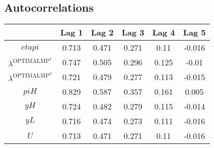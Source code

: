 \subsection{Autocorrelations}

\begin{tabular}{c|ccccc|}
  & Lag 1 & Lag 2 & Lag 3 & Lag 4 & Lag 5\\
\hline
${e\!t\!a\!p\!i}$ & 0.713 & 0.471 & 0.271 & 0.11 & -0.016 \\
$\lambda^{\mathrm{OPTIMALMP}^{\mathrm{1}}}$ & 0.747 & 0.505 & 0.296 & 0.125 & -0.01 \\
$\lambda^{\mathrm{OPTIMALMP}^{\mathrm{2}}}$ & 0.721 & 0.479 & 0.277 & 0.113 & -0.015 \\
${p\!i\!H}$ & 0.829 & 0.587 & 0.357 & 0.161 & 0.005 \\
${y\!H}$ & 0.724 & 0.482 & 0.279 & 0.115 & -0.014 \\
${y\!L}$ & 0.716 & 0.474 & 0.273 & 0.111 & -0.016 \\
$U$ & 0.713 & 0.471 & 0.271 & 0.11 & -0.016 \\
\hline
\end{tabular}


